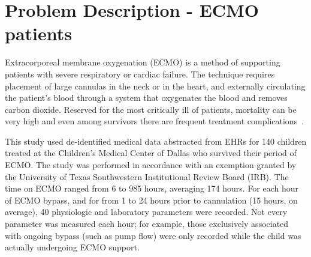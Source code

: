 \documentclass[letterpaper]{article} %
\begin{document}
\section{Problem Description - ECMO patients}
Extracorporeal membrane oxygenation (ECMO) is a method of supporting patients with severe respiratory or cardiac failure. The technique requires placement of large cannulas in the neck or in the heart, and externally circulating the patient's blood through a system that oxygenates the blood and removes carbon dioxide. Reserved for the most critically ill of patients, mortality can be very high and even among survivors there are frequent treatment complications~\cite{lin2017extracorporeal}. 

This study used de-identified medical data abstracted from EHRs for 140 children treated at the Children's Medical Center of Dallas who survived their period of ECMO. The study was performed in accordance with an exemption granted by the University of Texas Southwestern Institutional Review Board (IRB). The time on ECMO ranged from 6 to 985 hours, averaging 174 hours. For each hour of ECMO bypass, and for from 1 to 24 hours prior to cannulation (15 hours, on average), 40 physiologic and laboratory parameters were recorded. Not every parameter was measured each hour; for example, those exclusively associated with ongoing bypass (such as pump flow) were only recorded while the child was actually undergoing ECMO support.
\end{document}
